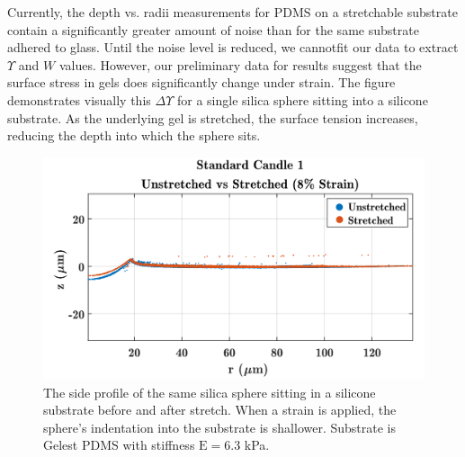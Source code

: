 Currently, the depth vs. radii measurements for PDMS on a stretchable substrate contain a significantly greater amount of noise than for the same substrate adhered to glass. Until the noise level is reduced, we cannotfit our data to extract $ \Upsilon $ and $ W $ values. However, our preliminary data for results suggest that the surface stress in gels does significantly change under strain. The figure demonstrates visually this $ \Delta\Upsilon $ for a single silica sphere sitting into a silicone substrate. As the underlying gel is stretched, the surface tension increases, reducing the depth into which the sphere sits. 
\begin{figure}[h!]
	\centering
	\includegraphics[width=\linewidth]{Chapters/Figures/sc1_unstretched_v_8ml}
	\caption[Side Collapse Comparison]{The side profile of the same silica sphere sitting in a silicone substrate before and after stretch. When a strain is applied, the sphere's indentation into the substrate is shallower. Substrate is Gelest PDMS with stiffness $\text{E}=6.3$ kPa.}	
	\label{fig:sc1unstretchedv8ml}
\end{figure}







